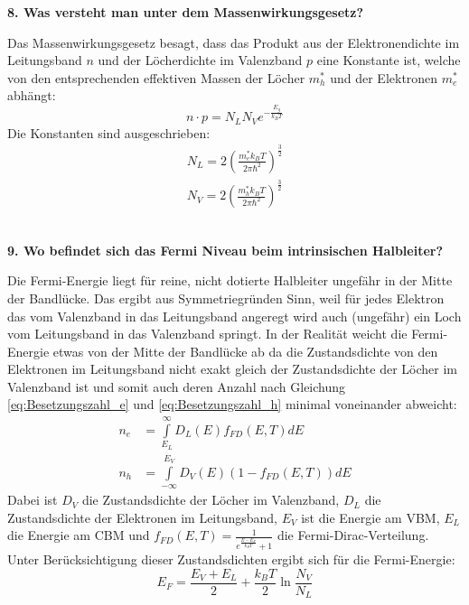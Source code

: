\noindent\textbf{8. Was versteht man unter dem Massenwirkungsgesetz?}\\
\begin{addmargin}[25pt]{0pt}
Das Massenwirkungsgesetz besagt, dass das Produkt aus der Elektronendichte im Leitungsband $n$ und der Löcherdichte im Valenzband $p$ eine Konstante ist, welche von den entsprechenden effektiven Massen der Löcher $m_h^*$ und der Elektronen $m_e^*$ abhängt:
\begin{equation}\label{eq:Massenwirkungsgesetz}
    n\cdot p = N_LN_Ve^{-\frac{E_g}{k_BT}}
\end{equation}
Die Konstanten sind ausgeschrieben:
\begin{align}
    N_L = 2\left(\frac{m_e^*k_BT}{2\pi\hbar^2}\right)^{\frac{3}{2}}\\
    N_V = 2\left(\frac{m_h^*k_BT}{2\pi\hbar^2}\right)^{\frac{3}{2}}
\end{align}\\
\end{addmargin}

\noindent\textbf{9. Wo befindet sich das Fermi Niveau beim intrinsischen Halbleiter?}\\
\begin{addmargin}[25pt]{0pt}
Die Fermi-Energie liegt für reine, nicht dotierte Halbleiter ungefähr in der Mitte der Bandlücke. Das ergibt aus Symmetriegründen Sinn, weil für jedes Elektron das vom Valenzband in das Leitungsband angeregt wird auch (ungefähr) ein Loch vom Leitungsband in das Valenzband springt. In der Realität weicht die Fermi-Energie etwas von der Mitte der Bandlücke ab da die Zustandsdichte von den Elektronen im Leitungsband nicht exakt gleich der Zustandsdichte der Löcher im Valenzband ist und somit auch deren Anzahl nach Gleichung \ref{eq:Besetzungszahl_e} und \ref{eq:Besetzungszahl_h} minimal voneinander abweicht:
\begin{align}\label{eq:Besetzungszahl_e}
n_e &= \int\limits_{E_L}^\infty D_L(E)f_{FD}(E,T)\si{d}E\\ \label{eq:Besetzungszahl_h} 
n_h &= \int\limits_{-\infty}^{E_V} D_V(E)\left(1-f_{FD}(E,T)\right)\si{d}E
\end{align}    
Dabei ist $D_V$ die Zustandsdichte der Löcher im Valenzband, $D_L$ die Zustandsdichte der Elektronen im Leitungsband, $E_V$ ist die Energie am VBM, $E_L$ die Energie am CBM und $f_{FD}(E,T) = \frac{1}{e^{\frac{E-E_F}{k_BT}}+1}$ die Fermi-Dirac-Verteilung. Unter Berücksichtigung dieser Zustandsdichten ergibt sich für die Fermi-Energie:
\begin{equation}
    E_{\si{F}} = \frac{E_{\si{V}} + E_{\si{L} }}{2} + \frac{k_BT}{2}\ln{\frac{N_V}{N_L}}
\end{equation}\\
\end{addmargin}

